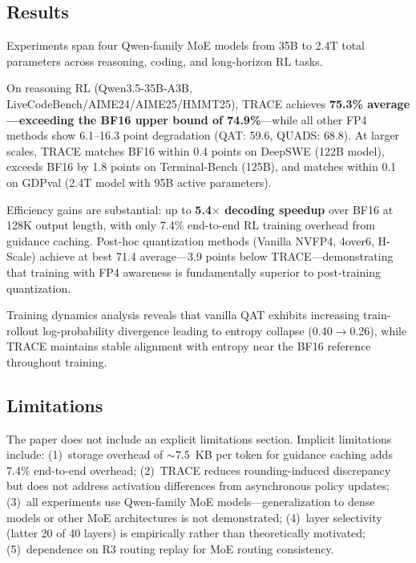 \documentclass[11pt,a4paper]{article}
\begin{document}
\subsection{Results}
Experiments span four Qwen-family MoE models from 35B to 2.4T total parameters across reasoning, coding, and long-horizon RL tasks.

On reasoning RL (Qwen3.5-35B-A3B, LiveCodeBench/AIME24/AIME25/HMMT25), TRACE achieves \textbf{75.3\% average---exceeding the BF16 upper bound of 74.9\%}---while all other FP4 methods show 6.1--16.3 point degradation (QAT: 59.6, QUADS: 68.8). At larger scales, TRACE matches BF16 within 0.4 points on DeepSWE (122B model), exceeds BF16 by 1.8 points on Terminal-Bench (125B), and matches within 0.1 on GDPval (2.4T model with 95B active parameters).

Efficiency gains are substantial: up to \textbf{5.4$\times$ decoding speedup} over BF16 at 128K output length, with only 7.4\% end-to-end RL training overhead from guidance caching. Post-hoc quantization methods (Vanilla NVFP4, 4over6, H-Scale) achieve at best 71.4 average---3.9 points below TRACE---demonstrating that training with FP4 awareness is fundamentally superior to post-training quantization.

Training dynamics analysis reveals that vanilla QAT exhibits increasing train-rollout log-probability divergence leading to entropy collapse (0.40$\to$0.26), while TRACE maintains stable alignment with entropy near the BF16 reference throughout training.

\subsection{Limitations}
The paper does not include an explicit limitations section. Implicit limitations include: (1)~storage overhead of ${\sim}7.5$~KB per token for guidance caching adds 7.4\% end-to-end overhead; (2)~TRACE reduces rounding-induced discrepancy but does not address activation differences from asynchronous policy updates; (3)~all experiments use Qwen-family MoE models---generalization to dense models or other MoE architectures is not demonstrated; (4)~layer selectivity (latter 20 of 40 layers) is empirically rather than theoretically motivated; (5)~dependence on R3 routing replay for MoE routing consistency.
\end{document}
